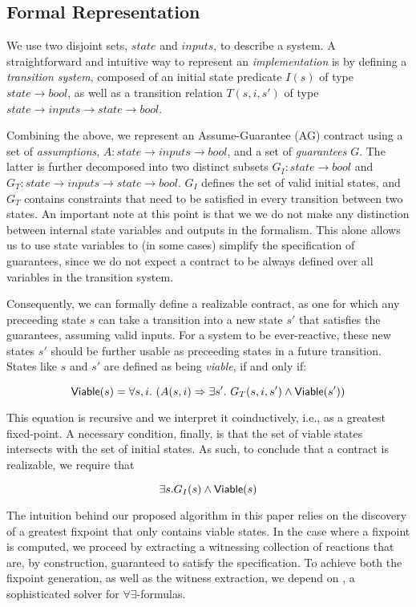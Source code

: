 \subsection{Formal Representation}
\label{sec:formals}
We use two disjoint sets, $state$ and $inputs$, to describe a system.
A straightforward and intuitive way to represent an \emph{implementation} is by
defining a \emph{transition system}, composed of an initial state
predicate $I(s)$ of type $state \to bool$, as well as a transition relation
$T(s,i,s')$ of type $state \to inputs \to state \to bool$.

Combining the above, we represent an Assume-Guarantee (AG) contract using a set
of \emph{assumptions}, $A: state \rightarrow inputs \rightarrow bool$,
and a set of \emph{guarantees} $G$. The latter is further decomposed into two
distinct subsets $G_I: state \rightarrow bool$ and $G_T: state \rightarrow
inputs \rightarrow state \rightarrow bool$. $G_I$ defines the set of valid
initial states, and $G_T$ contains constraints that need to be satisfied in
every transition between two states. An important note at this point is that we
we do not make any distinction between internal state variables and outputs in the
formalism. This alone allows us to use state variables to (in some cases)
simplify the specification of guarantees, since we do not expect a contract
to be always defined over all variables in the transition system.

Consequently, we can formally define a realizable contract, as one for which any
preceeding state $s$ can take a transition into a new state $s'$ that satisfies
the guarantees, assuming valid inputs. For a system to be ever-reactive, these
new states $s'$ should be further usable as preceeding states in a future
transition. States like $s$ and $s'$ are defined as being \textit{viable}, if
and only if:

\begin{equation}
{\mathsf {Viable}}(s) = \forall s,i. \ (A(s, i) \Rightarrow \exists s'.~ G_T(s, i,s')
\land {\mathsf {Viable}}(s'))
\label{eq:viable}
\end{equation}

This equation is recursive and we interpret it coinductively, i.e., as a
greatest fixed-point.
A necessary condition, finally, is that the set of viable states
intersects with the set of initial states. As such, to conclude that a contract
is realizable, we require that

\begin{equation}
\exists s. G_I(s) \land {\mathsf {Viable}}(s)
\label{eq:nonempty}
\end{equation}

The intuition behind our proposed algorithm in this paper relies on the
discovery of a greatest fixpoint that only contains viable states. In the case where a fixpoint is computed, we proceed by extracting a witnessing collection of reactions that are, by construction, guaranteed to satisfy the specification. To achieve both the fixpoint generation, as well as the witness extraction, we depend on \aeval, a sophisticated solver for $\forall\exists$-formulas.


